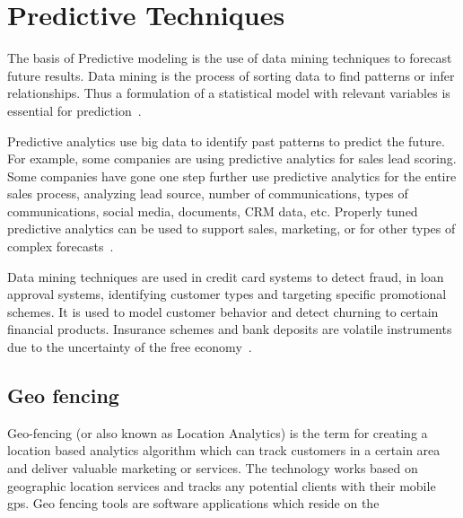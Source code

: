 %
%
%
%

\setlength{\footskip}{8mm}

\chapter{Predictive Techniques} 
\label{predictive-techniques}

The basis of Predictive modeling is the use of data mining techniques to forecast future results. Data mining is the process of sorting data to find patterns or infer relationships. Thus a formulation of a statistical model with relevant variables is essential for prediction~. 

Predictive analytics use big data to identify past patterns to predict the future. For example, some companies are using predictive analytics for sales lead scoring. Some companies have gone one step further use predictive analytics for the entire sales process, analyzing lead source, number of communications, types of communications, social media, documents, CRM data, etc. Properly tuned predictive analytics can be used to support sales, marketing, or for other types of complex forecasts~.

Data mining techniques are used in credit card systems to detect fraud, in loan approval systems, identifying customer types and targeting specific promotional schemes. It is used to model customer behavior and detect churning to certain financial products. Insurance schemes and bank deposits are volatile instruments due to the uncertainty of the free economy~.


%
%

%
%
%
%
\newpage
\section{Geo fencing}
Geo-fencing (or also known as Location Analytics) is the term for creating a location based analytics algorithm which can track customers in a certain area and deliver valuable marketing or services. The technology works based on geographic location services and tracks any potential clients with their mobile gps. 
Geo fencing tools are software applications which reside on the 

